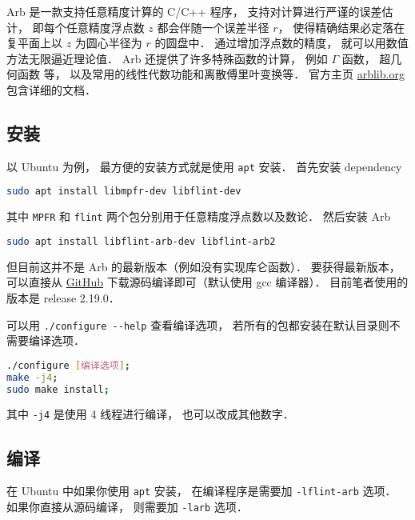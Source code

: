 

Arb 是一款支持任意精度计算的 C/C++ 程序， 支持对计算进行严谨的误差估计， 即每个任意精度浮点数 $z$ 都会伴随一个误差半径 $r$， 使得精确结果必定落在复平面上以 $z$ 为圆心半径为 $r$ 的圆盘中． 通过增加浮点数的精度， 就可以用数值方法无限逼近理论值． Arb 还提供了许多特殊函数的计算， 例如 $\Gamma$ 函数， 超几何函数 等， 以及常用的线性代数功能和离散傅里叶变换等． 官方主页 \href{https://arblib.org/}{arblib.org} 包含详细的文档．

\subsection{安装}
以 Ubuntu 为例， 最方便的安装方式就是使用 \verb|apt| 安装． 首先安装 dependency
\begin{lstlisting}[language=bash]
sudo apt install libmpfr-dev libflint-dev
\end{lstlisting}
其中 \verb|MPFR| 和 \verb|flint| 两个包分别用于任意精度浮点数以及数论． 然后安装 Arb
\begin{lstlisting}[language=bash]
sudo apt install libflint-arb-dev libflint-arb2
\end{lstlisting}

但目前这并不是 Arb 的最新版本（例如没有实现库仑函数）． 要获得最新版本， 可以直接从 \href{https://github.com/fredrik-johansson/arb/}{GitHub} 下载源码编译即可（默认使用 gcc 编译器）． 目前笔者使用的版本是 release 2.19.0．

可以用 \verb|./configure --help| 查看编译选项， 若所有的包都安装在默认目录则不需要编译选项．
\begin{lstlisting}[language=bash]
./configure [编译选项];
make -j4;
sudo make install;
\end{lstlisting}
其中 \verb|-j4| 是使用 4 线程进行编译， 也可以改成其他数字．

\subsection{编译}
在 Ubuntu 中如果你使用 \verb|apt| 安装， 在编译程序是需要加 \verb|-lflint-arb| 选项． 如果你直接从源码编译， 则需要加 \verb|-larb| 选项．

